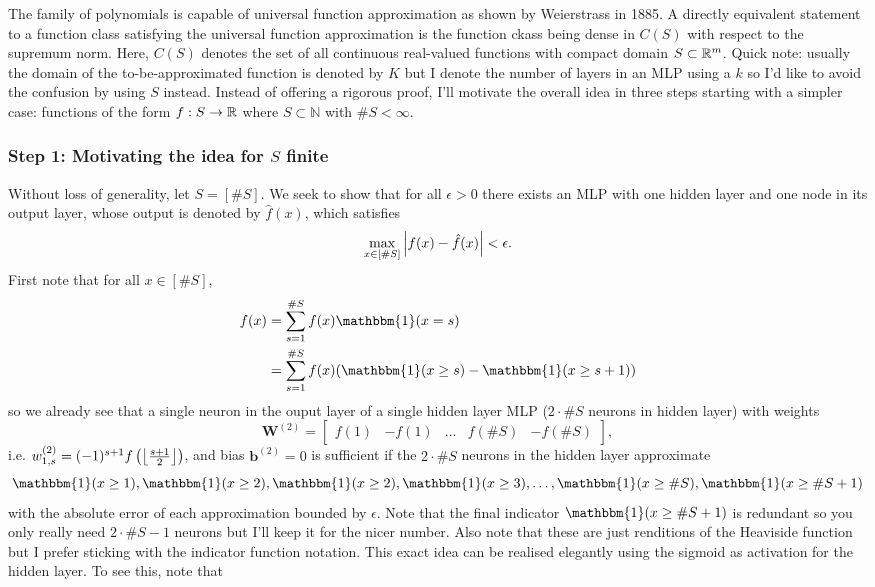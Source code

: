 \documentclass[11pt]{article}
\begin{document}
The family of polynomials is capable of universal function approximation as shown by Weierstrass in 1885. A directly equivalent statement to a function class satisfying the universal function approximation is the function ckass being dense in $C(S)$ with respect to the supremum norm. Here, $C(S)$ denotes the set of all continuous real-valued functions with compact domain $S\subset\mathbb{R}^m$. Quick note: usually the domain of the to-be-approximated function is denoted by $K$ but I denote the number of layers in an MLP using a $k$ so I'd like to avoid the confusion by using $S$ instead. Instead of offering a rigorous proof, I'll motivate the overall idea in three steps starting with a simpler case: functions of the form $f:S\to\mathbb{R}$ where $S\subset\mathbb{N}$ with $\#S<\infty$.

\subsubsection*{Step 1: Motivating the idea for $S$ finite}
Without loss of generality, let $S=[\#S]$. We seek to show that for all $\epsilon>0$ there exists an MLP with one hidden layer and one node in its output layer, whose output is denoted by $\hat{f}(x)$, which satisfies
$$
\max_{x\in [\#S]}\left|f(x)-\hat{f}(x)\right|<\epsilon.
$$
First note that for all $x\in[\#S]$,
\begin{align*}
f(x)
&=
\sum_{s=1}^{\#S}f(x)\mathbbm{1}(x=s)\\
&=
\sum_{s=1}^{\#S}f(x)(\mathbbm{1}(x\geq s)-\mathbbm{1}(x\geq s+1))
\end{align*}
so we already see that a single neuron in the ouput layer of a single hidden layer MLP ($2\cdot\#S$ neurons in hidden layer) with weights
$$
\mathbf{W}^{(2)}
=
\begin{bmatrix}
    f(1) & -f(1) & \dots & f(\#S) & -f(\#S)
\end{bmatrix},
$$
i.e. $w_{1,s}^{(2)}=(-1)^{s+1}f\left(\left\lfloor\frac{s+1}{2}\right\rfloor\right)$, and bias $\mathbf{b}^{(2)}=0$ is sufficient if the $2\cdot\#S$ neurons in the hidden layer approximate
$$
\mathbbm{1}(x\geq1),\mathbbm{1}(x\geq2),\mathbbm{1}(x\geq2),\mathbbm{1}(x\geq3),\dots,\mathbbm{1}(x\geq\#S),\mathbbm{1}(x\geq\#S+1)
$$
with the absolute error of each approximation bounded by $\epsilon$. Note that the final indicator $\mathbbm{1}(x\geq\#S+1)$ is redundant so you only really need $2\cdot\#S-1$ neurons but I'll keep it for the nicer number. Also note that these are just renditions of the Heaviside function but I prefer sticking with the indicator function notation. This exact idea can be realised elegantly using the sigmoid as activation for the hidden layer. To see this, note that
\end{document}

